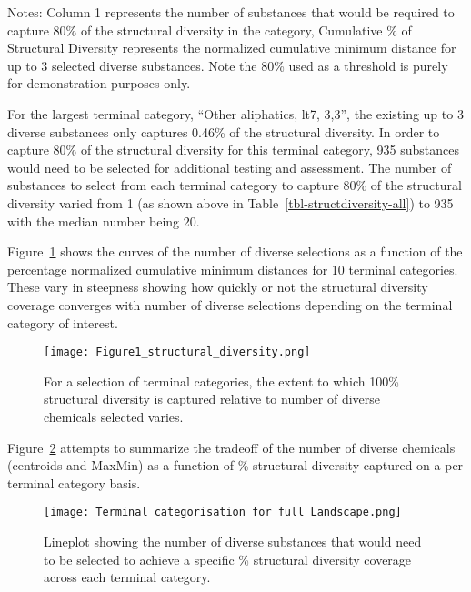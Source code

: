 \documentclass[
  super,
  preprint,
  3p]{elsarticle}
\begin{document}
Notes: Column 1 represents the number of substances that would be
required to capture 80\% of the structural diversity in the category,
Cumulative \% of Structural Diversity represents the normalized
cumulative minimum distance for up to 3 selected diverse substances.
Note the 80\% used as a threshold is purely for demonstration purposes
only.

For the largest terminal category, ``Other aliphatics, lt7, 3,3'', the
existing up to 3 diverse substances only captures 0.46\% of the
structural diversity. In order to capture 80\% of the structural
diversity for this terminal category, 935 substances would need to be
selected for additional testing and assessment. The number of substances
to select from each terminal category to capture 80\% of the structural
diversity varied from 1 (as shown above in
Table~\ref{tbl-structdiversity-all}) to 935 with the median number being
20.

Figure~\ref{fig-structdiv} shows the curves of the number of diverse
selections as a function of the percentage normalized cumulative minimum
distances for 10 terminal categories. These vary in steepness showing
how quickly or not the structural diversity coverage converges with
number of diverse selections depending on the terminal category of
interest.

\begin{figure}

{\centering \texttt{[image: Figure1\_structural\_diversity.png]}

}

\caption{\label{fig-structdiv}For a selection of terminal categories,
the extent to which 100\% structural diversity is captured relative to
number of diverse chemicals selected varies.}

\end{figure}

Figure~\ref{fig-structdiv-corr} attempts to summarize the tradeoff of
the number of diverse chemicals (centroids and MaxMin) as a function of
\% structural diversity captured on a per terminal category basis.

\begin{figure}

{\centering \texttt{[image: Terminal categorisation for full Landscape.png]}

}

\caption{\label{fig-structdiv-corr}Lineplot showing the number of
diverse substances that would need to be selected to achieve a specific
\% structural diversity coverage across each terminal category.}

\end{figure}
\end{document}
